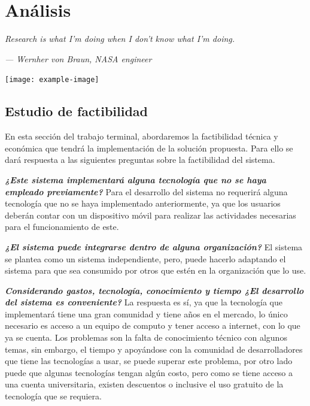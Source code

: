 \chapter{Análisis} \label{analisis}
\epigraph{\textit{Research is what I'm doing when I don't know what I'm doing.   
	}}{\textit{— Wernher von Braun, NASA engineer}}
	\vspace*{8cm}
	\begin{center}
		\centering
		\texttt{[image: example-image]}
    \end{center}
\thispagestyle{empty}
\newpage
\vspace*{2cm}

\section{Estudio de factibilidad}
En esta sección del trabajo terminal, abordaremos la factibilidad técnica y económica que tendrá la implementación de la solución propuesta. Para ello se dará respuesta a las siguientes preguntas sobre la factibilidad del sistema.

\textbf{\textit{¿Este sistema implementará alguna tecnología que no se haya empleado previamente?}}\newline
Para el desarrollo del sistema no requerirá alguna tecnología que no se haya implementado anteriormente, ya que los usuarios deberán contar con un dispositivo móvil para realizar las actividades necesarias para el funcionamiento de este. 

\textbf{\textit{¿El sistema puede integrarse dentro de alguna organización?}}\newline
El sistema se plantea como un sistema independiente, pero, puede hacerlo adaptando el sistema para que sea consumido por otros que estén en la organización que lo use.

\textbf{\textit{Considerando gastos, tecnología, conocimiento y tiempo ¿El desarrollo del sistema es conveniente?}}\newline
La respuesta es sí, ya que la tecnología que implementará tiene una gran comunidad y tiene años en el mercado, lo único necesario es acceso a un equipo de computo y tener acceso a internet, con lo que ya se cuenta. Los problemas son la falta de conocimiento técnico con algunos temas, sin embargo, el tiempo y apoyándose con la comunidad de desarrolladores que tiene las tecnologías a usar, se puede superar este problema, por otro lado puede que algunas tecnologías tengan algún costo, pero como se tiene acceso a una cuenta universitaria, existen descuentos o inclusive el uso gratuito de la tecnología que se requiera.

